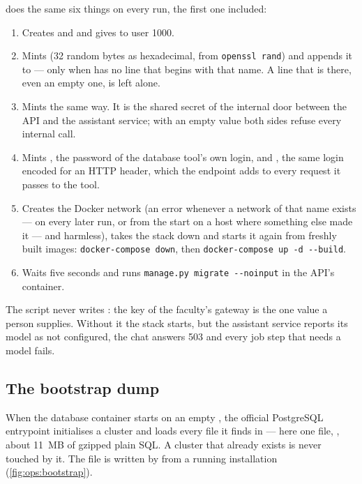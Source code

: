  does the same six things on every run, the first one included:

\begin{enumerate}
  \item Creates  and  and gives 
    to user 1000.
  \item Mints  (32 random bytes as hexadecimal, from
    \texttt{openssl rand}) and appends it to  --- only when  has no line
    that begins with that name. A line that is there, even an empty one, is left alone.
  \item Mints  the same way. It is the shared secret of the
    internal door between the API and the assistant service; with an empty value both sides
    refuse every internal call.
  \item Mints , the password of the database tool's own login, and
    , the same login encoded for an HTTP header, which the endpoint
    adds to every request it passes to the tool.
  \item Creates the Docker network  (an error whenever a network of that name
    exists --- on every later run, or from the start on a host where something else made it
    --- and harmless), takes the stack down and starts it again from freshly built images:
    \texttt{docker-compose down}, then \texttt{docker-compose up -d -{}-build}.
  \item Waits five seconds and runs \texttt{manage.py migrate -{}-noinput} in the API's
    container.
\end{enumerate}

The script never writes : the key of the faculty's gateway is the one
value a person supplies. Without it the stack starts, but the assistant service reports its
model as not configured, the chat answers 503 and every job step that needs a model fails.

\subsection{The bootstrap dump}\label{sec:ops:bootstrap}

When the database container starts on an empty , the official PostgreSQL
entrypoint initialises a cluster and loads every file it finds in
 --- here one file, , about
11~MB of gzipped plain SQL. A cluster that already exists is never touched by it. The file is
written by  from a running installation
(\cref{fig:ops:bootstrap}).

